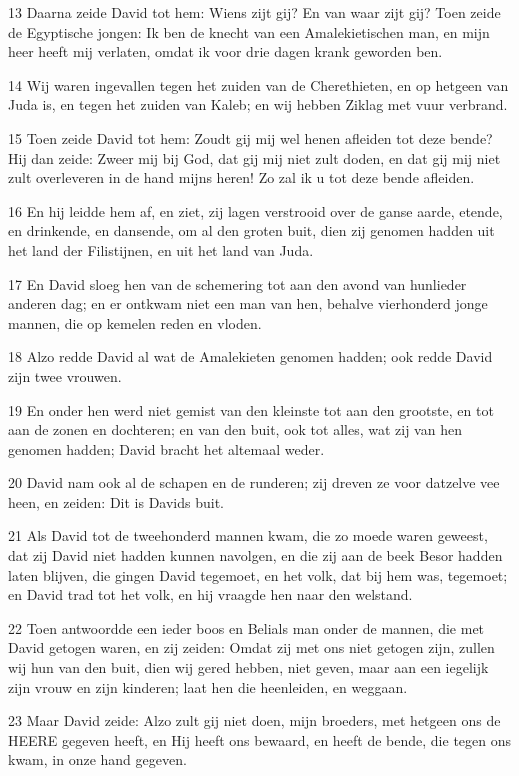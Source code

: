 \par 13 Daarna zeide David tot hem: Wiens zijt gij? En van waar zijt gij? Toen zeide de Egyptische jongen: Ik ben de knecht van een Amalekietischen man, en mijn heer heeft mij verlaten, omdat ik voor drie dagen krank geworden ben.
\par 14 Wij waren ingevallen tegen het zuiden van de Cherethieten, en op hetgeen van Juda is, en tegen het zuiden van Kaleb; en wij hebben Ziklag met vuur verbrand.
\par 15 Toen zeide David tot hem: Zoudt gij mij wel henen afleiden tot deze bende? Hij dan zeide: Zweer mij bij God, dat gij mij niet zult doden, en dat gij mij niet zult overleveren in de hand mijns heren! Zo zal ik u tot deze bende afleiden.
\par 16 En hij leidde hem af, en ziet, zij lagen verstrooid over de ganse aarde, etende, en drinkende, en dansende, om al den groten buit, dien zij genomen hadden uit het land der Filistijnen, en uit het land van Juda.
\par 17 En David sloeg hen van de schemering tot aan den avond van hunlieder anderen dag; en er ontkwam niet een man van hen, behalve vierhonderd jonge mannen, die op kemelen reden en vloden.
\par 18 Alzo redde David al wat de Amalekieten genomen hadden; ook redde David zijn twee vrouwen.
\par 19 En onder hen werd niet gemist van den kleinste tot aan den grootste, en tot aan de zonen en dochteren; en van den buit, ook tot alles, wat zij van hen genomen hadden; David bracht het altemaal weder.
\par 20 David nam ook al de schapen en de runderen; zij dreven ze voor datzelve vee heen, en zeiden: Dit is Davids buit.
\par 21 Als David tot de tweehonderd mannen kwam, die zo moede waren geweest, dat zij David niet hadden kunnen navolgen, en die zij aan de beek Besor hadden laten blijven, die gingen David tegemoet, en het volk, dat bij hem was, tegemoet; en David trad tot het volk, en hij vraagde hen naar den welstand.
\par 22 Toen antwoordde een ieder boos en Belials man onder de mannen, die met David getogen waren, en zij zeiden: Omdat zij met ons niet getogen zijn, zullen wij hun van den buit, dien wij gered hebben, niet geven, maar aan een iegelijk zijn vrouw en zijn kinderen; laat hen die heenleiden, en weggaan.
\par 23 Maar David zeide: Alzo zult gij niet doen, mijn broeders, met hetgeen ons de HEERE gegeven heeft, en Hij heeft ons bewaard, en heeft de bende, die tegen ons kwam, in onze hand gegeven.
